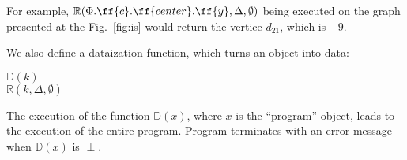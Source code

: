 For example, $\mathbb{R}(\Phi.\ff{c}.\ff{center}.\ff{y},
\Delta, \emptyset)$ being executed on the graph presented at the
Fig.~\ref{fig:is} would return the vertice $d_{21}$, which is $+9$.

We also define a dataization function, which turns an object into data:

\begin{algo}
 $\mathbb{D}(k)$ \\
  \tab {} $\mathbb{R}(k, \Delta, \emptyset)$ \\
\end{algo}

The execution of the function $\mathbb{D}(x)$, where $x$ is the
``program'' object, leads to the execution of the entire program.
Program terminates with an error message when $\mathbb{D}(x)$ is $\perp$.

